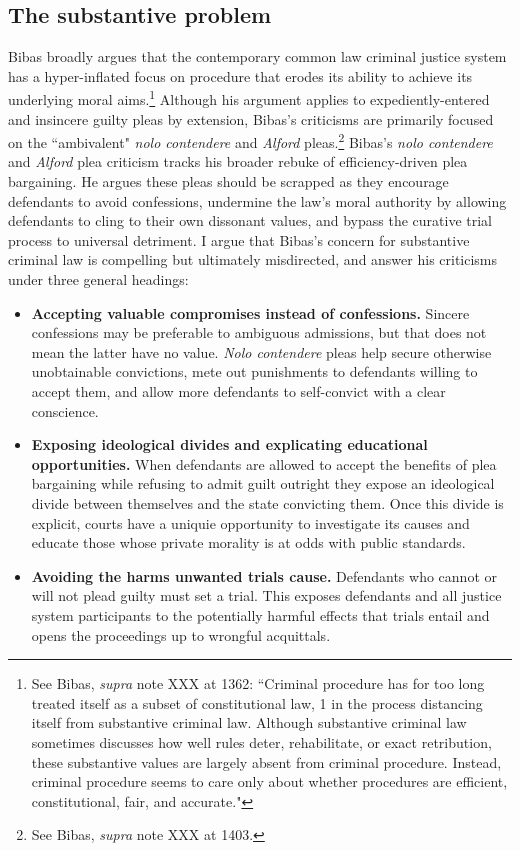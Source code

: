 \subsection{The substantive problem}

Bibas broadly argues that the contemporary common law criminal justice system has a hyper-inflated focus on procedure that erodes its ability to achieve its underlying moral aims.\footnote{See Bibas, \textit{supra} note XXX at 1362: ``Criminal procedure has for too long treated itself as a subset of constitutional law, 1 in the process distancing itself from substantive criminal law. Although substantive criminal law sometimes discusses how well rules deter, rehabilitate, or exact retribution, these substantive values are largely absent from criminal procedure. Instead, criminal procedure seems to care only about whether procedures are efficient, constitutional, fair, and accurate."} Although his argument applies to expediently-entered and insincere guilty pleas by extension, Bibas's criticisms are primarily focused on the ``ambivalent" \textit{nolo contendere} and \textit{Alford} pleas.\footnote{See Bibas, \textit{supra} note XXX at 1403.} Bibas's \textit{nolo contendere} and \textit{Alford} plea criticism tracks his broader rebuke of efficiency-driven plea bargaining. He argues these pleas should be scrapped as they encourage defendants to avoid confessions, undermine the law's moral authority by allowing defendants to cling to their own dissonant values, and bypass the curative trial process to universal detriment. I argue that Bibas's concern for substantive criminal law is compelling but ultimately misdirected, and answer his criticisms under three general headings:

\begin{itemize}
    \item \textbf{Accepting valuable compromises instead of confessions.} Sincere confessions may be preferable to ambiguous admissions, but that does not mean the latter have no value. \textit{Nolo contendere} pleas help secure otherwise unobtainable convictions, mete out punishments to defendants willing to accept them, and allow more defendants to self-convict with a clear conscience.
    \item \textbf{Exposing ideological divides and explicating educational opportunities.} When defendants are allowed to accept the benefits of plea bargaining while refusing to admit guilt outright they expose an ideological divide between themselves and the state convicting them. Once this divide is explicit, courts have a uniquie opportunity to investigate its causes and educate those whose private morality is at odds with public standards.
    \item \textbf{Avoiding the harms unwanted trials cause.} Defendants who cannot or will not plead guilty must set a trial. This exposes defendants and all justice system participants to the potentially harmful effects that trials entail and opens the proceedings up to wrongful acquittals.
\end{itemize}

